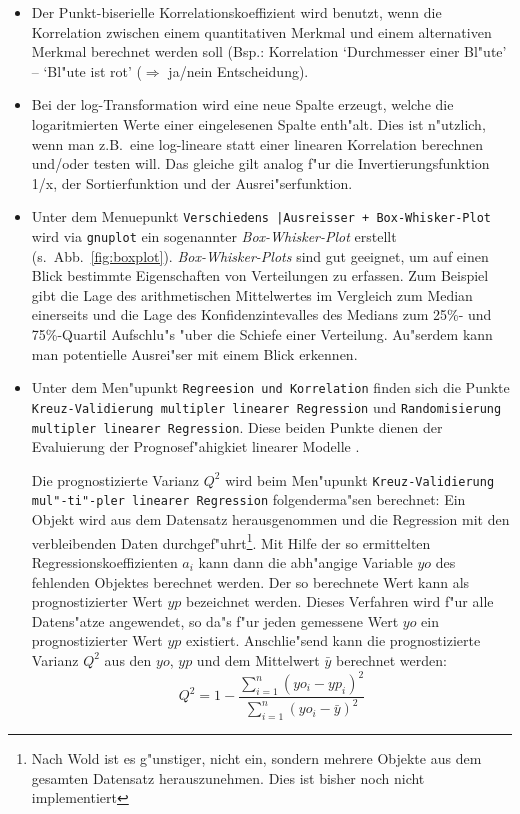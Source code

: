 \documentclass[a4paper,11pt]{article}
\begin{document}
\begin{itemize}
\item Der Punkt-biserielle Korrelationskoeffizient wird benutzt, wenn
  die Korrelation zwischen einem quantitativen Merkmal und einem
  alternativen Merkmal berechnet werden soll (Bsp.: Korrelation
  `Durchmesser einer Bl"ute' -- `Bl"ute ist rot' ($\Longrightarrow$
  ja/nein Entscheidung).
\item Bei der log-Transformation wird eine neue Spalte erzeugt, welche
  die logaritmierten Werte einer eingelesenen Spalte enth"alt. Dies ist
  n"utzlich, wenn man z.B.\ eine log-lineare statt einer
  linearen Korrelation berechnen und/oder testen will. Das gleiche
  gilt analog f"ur die Invertierungsfunktion 1/x, der Sortierfunktion
  und der Ausrei"serfunktion. 
\item Unter dem Menuepunkt {\tt Verschiedens |Ausreisser +
    Box-Whisker-Plot} wird via {\tt gnuplot} ein sogenannter {\em
    Box-Whisker-Plot} \cite[S. 835 f\/f]{hartung86} erstellt (s.\ 
  Abb.\ \ref{fig:boxplot}). {\em Box-Whisker-Plots} sind gut geeignet,
  um auf einen Blick bestimmte Eigenschaften von Verteilungen zu
  erfassen. Zum Beispiel gibt die Lage des arithmetischen Mittelwertes
  im Vergleich zum Median einerseits und die Lage des
  Konfidenzintevalles des Medians zum 25\%- und 75\%-Quartil
  Aufschlu"s "uber die Schiefe einer Verteilung. Au"serdem kann man
  potentielle Ausrei"ser mit einem Blick erkennen.
\item Unter dem Men"upunkt {\tt Regreesion und Korrelation} finden
  sich die Punkte {\tt Kreuz-Validierung multipler linearer
  Regression} und {\tt Randomisierung multipler linearer Regression}.
  Diese beiden Punkte dienen der Evaluierung der Prognosef"ahigkiet
  linearer Modelle \cite{wold91,wold95}.

  Die prognostizierte Varianz $Q^2$ wird beim
  Men"upunkt {\tt Kreuz-Validierung mul"-ti"-pler linearer Regression}
  folgenderma"sen berechnet: Ein Objekt wird aus dem Datensatz
  herausgenommen und die
  Regression mit den verbleibenden Daten durchgef"uhrt\footnote{ %
    Nach {\sc Wold} ist es g"unstiger, nicht ein, sondern mehrere
    Objekte aus dem gesamten Datensatz herauszunehmen. Dies ist bisher
    noch nicht implementiert}. %
  Mit Hilfe der so ermittelten Regressionskoeffizienten $a_i$ kann
  dann die abh"angige Variable $yo$ des fehlenden Objektes berechnet
  werden. Der so berechnete Wert kann als prognostizierter Wert $yp$
  bezeichnet werden. Dieses Verfahren wird f"ur alle Datens"atze
  angewendet, so da"s f"ur jeden gemessene Wert $yo$ ein
  prognostizierter Wert $yp$ existiert.  Anschlie"send kann die
  prognostizierte Varianz $Q^2$ aus den $yo$, $yp$ und dem Mittelwert
  $\bar{y}$ berechnet werden:
  \begin{equation}  
  \label{eq:q^2-def}
  Q^2 = 1 - \frac{\sum\limits_{i=1}^n (yo_i - yp_i)^2}
  {\sum\limits_{i=1}^n (yo_i-\bar{y})^2}
  \end{equation}
  

\end{itemize}
\end{document}
